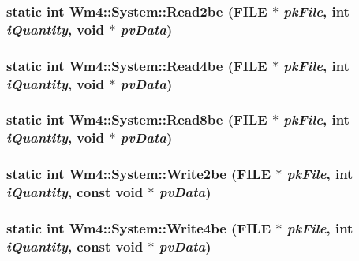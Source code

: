 \subsubsection{\setlength{\rightskip}{0pt plus 5cm}static int Wm4::System::Read2be (FILE $\ast$ {\em pk\-File}, int {\em i\-Quantity}, void $\ast$ {\em pv\-Data})\hspace{0.3cm}{\tt  [static]}}\label{classWm4_1_1System_fea3a45fc47a19ae287c92799e1ae67c}


\subsubsection{\setlength{\rightskip}{0pt plus 5cm}static int Wm4::System::Read4be (FILE $\ast$ {\em pk\-File}, int {\em i\-Quantity}, void $\ast$ {\em pv\-Data})\hspace{0.3cm}{\tt  [static]}}\label{classWm4_1_1System_366ff49f9a2af7f14c99d65a0366215f}


\subsubsection{\setlength{\rightskip}{0pt plus 5cm}static int Wm4::System::Read8be (FILE $\ast$ {\em pk\-File}, int {\em i\-Quantity}, void $\ast$ {\em pv\-Data})\hspace{0.3cm}{\tt  [static]}}\label{classWm4_1_1System_c140bcbc5b9cc63099dc09c5c86fde27}


\subsubsection{\setlength{\rightskip}{0pt plus 5cm}static int Wm4::System::Write2be (FILE $\ast$ {\em pk\-File}, int {\em i\-Quantity}, const void $\ast$ {\em pv\-Data})\hspace{0.3cm}{\tt  [static]}}\label{classWm4_1_1System_6b0f65a93d1de6b622157ee753bb0d3b}


\subsubsection{\setlength{\rightskip}{0pt plus 5cm}static int Wm4::System::Write4be (FILE $\ast$ {\em pk\-File}, int {\em i\-Quantity}, const void $\ast$ {\em pv\-Data})\hspace{0.3cm}{\tt  [static]}}\label{classWm4_1_1System_c0bd859fe6d7c7fed6011972f3a8f25d}


